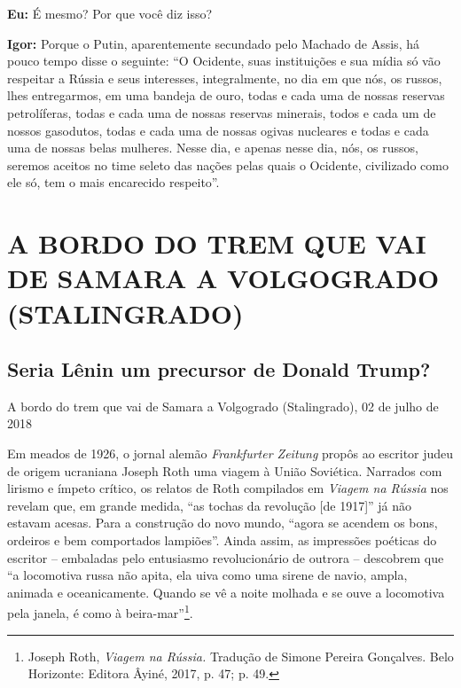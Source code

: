 \textbf{Eu:} É mesmo? Por que você diz isso?

\textbf{Igor:} Porque o Putin, aparentemente secundado pelo Machado de
Assis, há pouco tempo disse o seguinte: ``O Ocidente, suas instituições
e sua mídia só vão respeitar a Rússia e seus interesses, integralmente,
no dia em que nós, os russos, lhes entregarmos, em uma bandeja de ouro,
todas e cada uma de nossas reservas petrolíferas, todas e cada uma de
nossas reservas minerais, todos e cada um de nossos gasodutos, todas e
cada uma de nossas ogivas nucleares e todas e cada uma de nossas belas
mulheres. Nesse dia, e apenas nesse dia, nós, os russos, seremos aceitos
no time seleto das nações pelas quais o Ocidente, civilizado como ele
só, tem o mais encarecido respeito''.

\newpage
{}
\part*{A BORDO DO TREM QUE VAI DE SAMARA A VOLGOGRADO (STALINGRADO)}

\chapter*{Seria Lênin um precursor de Donald Trump?}

\begin{flushright}
A bordo do trem que vai de Samara a Volgogrado (Stalingrado),
02 de julho de 2018
\end{flushright}

Em meados de 1926, o jornal alemão \emph{Frankfurter Zeitung} propôs ao
escritor judeu de origem ucraniana Joseph Roth uma viagem à União
Soviética. Narrados com lirismo e ímpeto crítico, os relatos de Roth
compilados em \emph{Viagem na Rússia} nos revelam que, em grande medida,
``as tochas da revolução {[}de 1917{]}'' já não estavam acesas. Para a
construção do novo mundo, ``agora se acendem os bons, ordeiros e bem
comportados lampiões''. Ainda assim, as impressões poéticas do escritor
-- embaladas pelo entusiasmo revolucionário de outrora -- descobrem que
``a locomotiva russa não apita, ela uiva como uma sirene de navio,
ampla, animada e oceanicamente. Quando se vê a noite molhada e se ouve a
locomotiva pela janela, é como à beira-mar''\footnote{Joseph Roth,
  \emph{Viagem na Rússia.} Tradução de Simone Pereira Gonçalves. Belo
  Horizonte: Editora Âyiné, 2017, p. 47; p. 49.}.

